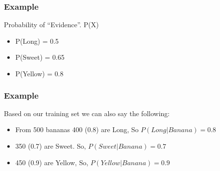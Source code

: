 

\begin{frame}[fragile]\frametitle{Example}
Probability of ``Evidence''. P(X)
\begin{itemize}
\item P(Long)   = 0.5
\item P(Sweet)  = 0.65
\item P(Yellow) = 0.8
\end{itemize}
\end{frame}


\begin{frame}[fragile]\frametitle{Example}
Based on our training set we can also say the following:
\begin{itemize}
\item From 500 bananas 400 (0.8) are Long, So $P(Long|Banana) = 0.8$
\item 350 (0.7) are Sweet. So, $P(Sweet|Banana) = 0.7$
\item 450 (0.9) are Yellow, So, $P(Yellow|Banana) = 0.9$
\end{itemize}
\end{frame}

